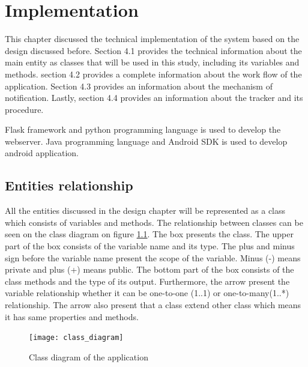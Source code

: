 


\chapter{Implementation}
This chapter discussed the technical implementation of the system based on the design discussed before.
Section 4.1 provides the technical information about the main entity as classes that will be used in this study, including its variables and methods.
section 4.2  provides a complete information about the work flow of the application.
Section 4.3 provides an information about the mechanism of notification. Lastly, section 4.4 provides an information about the tracker and its procedure.

Flask framework and python programming language is used to develop the webserver. Java programming language and Android SDK is used to develop android application.





\section{Entities relationship}
All the entities discussed in the design chapter will be represented as a class which consists of variables and methods.
The relationship between classes can be seen on the class diagram on figure \ref{fig:class_diagram}.
 The box presents the class. The upper part of the box consists of the variable name and its type.
 The plus and minus sign before the variable name present the scope of the variable.
  Minus (-) means private and plus (+) means public.
  The bottom part of the box consists of the class methods and the type of its output.
  Furthermore, the arrow present the variable relationship whether it can be one-to-one (1..1)  or one-to-many(1..*) relationship.
  The arrow also present that a class extend other class which means it has same properties and methods.

\begin{figure}
\begin{center}
\texttt{[image: class\_diagram]}
\end{center}
\caption{Class diagram of the application}
\label{fig:class_diagram}
\end{figure}

